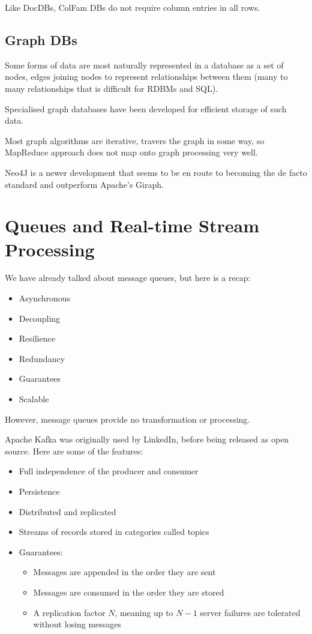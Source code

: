 \documentclass[11pt,a4paper,titlepage,dvipsnames,cmyk]{scrartcl}
\begin{document}
Like DocDBs, ColFam DBs do not require column entries in all rows.

\subsection{Graph DBs}
Some forms of data are most naturally represented in a database as a set of nodes, edges joining nodes to represent relationships between them (many to many relationships that is difficult for RDBMs and SQL).

Specialised graph databases have been developed for efficient storage of such data.

Most graph algorithms are iterative, travers the graph in some way, so MapReduce approach does not map onto graph processing very well.

Neo4J is a newer development that seems to be en route to becoming the de facto standard and outperform Apache's Giraph. 

\section{Queues and Real-time Stream Processing}
We have already talked about message queues, but here is a recap:
\begin{itemize}
    \item Asynchronous
    \item Decoupling
    \item Resilience
    \item Redundancy
    \item Guarantees
    \item Scalable
\end{itemize}

However, message queues provide no transformation or processing.

Apache Kafka was originally used by LinkedIn, before being released as open source. Here are some of the features:
\begin{itemize}
    \item Full independence of the producer and consumer
    \item Persistence
    \item Distributed and replicated
    \item Streams of records stored in categories called topics
    \item Guarantees:
    \begin{itemize}
        \item Messages are appended in the order they are sent
        \item Messages are consumed in the order they are stored
        \item A replication factor $N$, meaning up to $N-1$ server failures are tolerated without losing messages
    \end{itemize}
\end{itemize}
\end{document}
